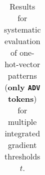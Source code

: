 \begin{table}[t]
\begin{tabular}{lllllll}

\hline
\end{tabular}
\caption[Model Evaluation for only \texttt{ADV} tokens]{Results for systematic evaluation of one-hot-vector patterns (\textbf{only \texttt{ADV} tokens}) for multiple integrated gradient thresholds $t$.}
\label{tab:evalResultsADV}
\end{table}
	